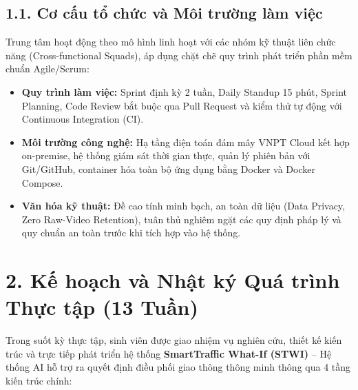 \subsection*{1.1. Cơ cấu tổ chức và Môi trường làm việc}
Trung tâm hoạt động theo mô hình linh hoạt với các nhóm kỹ thuật liên chức năng (Cross-functional Squads), áp dụng chặt chẽ quy trình phát triển phần mềm chuẩn Agile/Scrum:
\begin{itemize}[leftmargin=1.5cm, label=$\bullet$]
  \item \textbf{Quy trình làm việc:} Sprint định kỳ 2 tuần, Daily Standup 15 phút, Sprint Planning, Code Review bắt buộc qua Pull Request và kiểm thử tự động với Continuous Integration (CI).
  \item \textbf{Môi trường công nghệ:} Hạ tầng điện toán đám mây VNPT Cloud kết hợp on-premise, hệ thống giám sát thời gian thực, quản lý phiên bản với Git/GitHub, container hóa toàn bộ ứng dụng bằng Docker và Docker Compose.
  \item \textbf{Văn hóa kỹ thuật:} Đề cao tính minh bạch, an toàn dữ liệu (Data Privacy, Zero Raw-Video Retention), tuân thủ nghiêm ngặt các quy định pháp lý và quy chuẩn an toàn trước khi tích hợp vào hệ thống.
\end{itemize}

\section*{2. Kế hoạch và Nhật ký Quá trình Thực tập (13 Tuần)}

Trong suốt kỳ thực tập, sinh viên được giao nhiệm vụ nghiên cứu, thiết kế kiến trúc và trực tiếp phát triển hệ thống \textbf{SmartTraffic What-If (STWI)} -- Hệ thống AI hỗ trợ ra quyết định điều phối giao thông thông minh thông qua 4 tầng kiến trúc chính:

